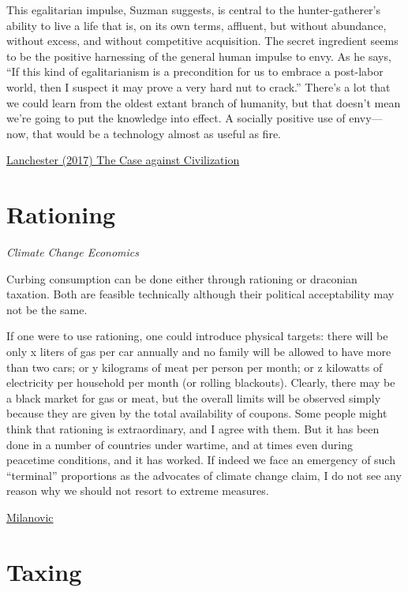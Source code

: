 \documentclass[
]{book}
\begin{document}
This egalitarian impulse, Suzman suggests, is central to the hunter-gatherer's ability to live a life that is, on its own terms, affluent, but without abundance, without excess, and without competitive acquisition. The secret ingredient seems to be the positive harnessing of the general human impulse to envy. As he says, ``If this kind of egalitarianism is a precondition for us to embrace a post-labor world, then I suspect it may prove a very hard nut to crack.'' There's a lot that we could learn from the oldest extant branch of humanity, but that doesn't mean we're going to put the knowledge into effect. A socially positive use of envy---now, that would be a technology almost as useful as fire.

\href{https://www.newyorker.com/magazine/2017/09/18/the-case-against-civilization}{Lanchester (2017) The Case against Civilization}

\hypertarget{rationing}{%
\chapter{Rationing}\label{rationing}}

\emph{Climate Change Economics}

Curbing consumption can be done either through rationing or draconian taxation. Both are feasible technically although their political acceptability may not be the same.

If one were to use rationing, one could introduce physical targets: there will be only x liters of gas per car annually and no family will be allowed to have more than two cars; or y kilograms of meat per person per month; or z kilowatts of electricity per household per month (or rolling blackouts). Clearly, there may be a black market for gas or meat, but the overall limits will be observed simply because they are given by the total availability of coupons. Some people might think that rationing is extraordinary, and I agree with them. But it has been done in a number of countries under wartime, and at times even during peacetime conditions, and it has worked. If indeed we face an emergency of such ``terminal'' proportions as the advocates of climate change claim, I do not see any reason why we should not resort to extreme measures.

\href{http://glineq.blogspot.com/2021/02/climate-change-covid-and-global.html}{Milanovic}

\hypertarget{taxing}{%
\chapter{Taxing}\label{taxing}}
\end{document}
